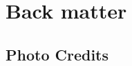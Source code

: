 
\clearpage

\setcounter{secnumdepth}{-1}


\chapter{Back matter} \label{backmatter}
\section{Photo Credits} \label{photocredits}


